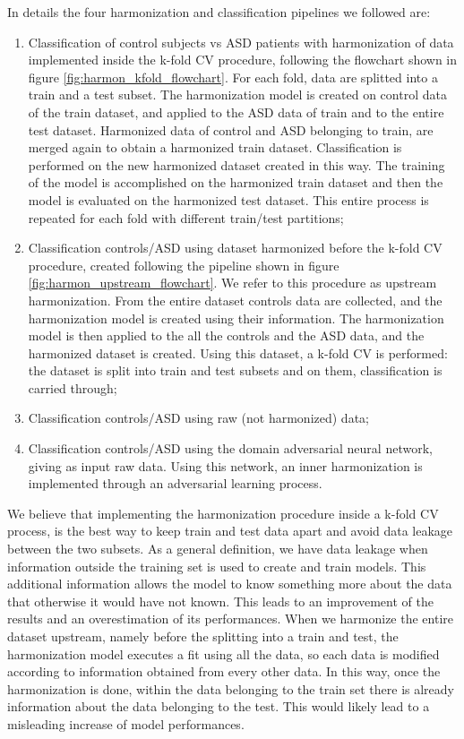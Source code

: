 \documentclass[11pt]{report}
\begin{document}
In details the four harmonization and classification pipelines we followed are:
\begin{enumerate}
\item Classification of control subjects vs ASD patients with harmonization of data implemented inside the k-fold CV procedure, following the flowchart shown in figure \ref{fig:harmon_kfold_flowchart}. 
For each fold, data are splitted into a train and a test subset. 
The harmonization model is created on control data of the train dataset, and applied to the ASD data of train and to the entire test dataset. 
Harmonized data of control and ASD belonging to train, are merged again to obtain a harmonized train dataset. 
Classification is performed on the new harmonized dataset created in this way. The training of the model is accomplished on the harmonized train dataset and then the model is evaluated on the harmonized test dataset. 
This entire process is repeated for each fold with different train/test partitions;

\item Classification controls/ASD using dataset harmonized before the k-fold CV procedure, created following the pipeline shown in figure \ref{fig:harmon_upstream_flowchart}. We refer to this procedure as upstream harmonization.
From the entire dataset controls data are collected, and the harmonization model is created using their information. 
The harmonization model is then applied to the all the controls and the ASD data, and the harmonized dataset is created. 
Using this dataset, a k-fold CV is performed: the dataset is split into train and test subsets and on them, classification is carried through;
\item Classification controls/ASD using raw (not harmonized) data;
\item Classification controls/ASD using the domain adversarial neural network, giving as input raw data. Using this network, an inner harmonization is implemented through an adversarial learning process.
\end{enumerate}


We believe that implementing the harmonization procedure inside a k-fold CV process, is the best way to keep train and test data apart and avoid data leakage between the two subsets.
As a general definition, we have data leakage when information outside the training set is used to create and train models. This additional information allows the model to know something more about the data that otherwise it would have not known.
This leads to an improvement of the results and an overestimation of its performances.
When we harmonize the entire dataset upstream, namely before the splitting into a train and test, the harmonization model executes a fit using all the data, so each data is modified according to information obtained from every other data.
In this way, once the harmonization is done, within the data belonging to the train set there is already information about the data belonging to the test. 
This would likely lead to a misleading increase of model performances.
\end{document}
